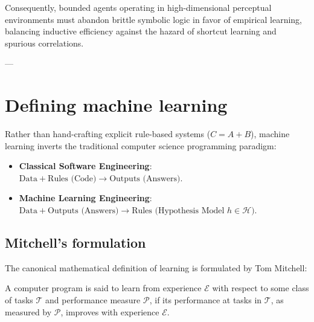 Consequently, bounded agents operating in high-dimensional perceptual environments must abandon brittle symbolic logic in favor of empirical learning, balancing inductive efficiency against the hazard of shortcut learning and spurious correlations.

---

\section{Defining machine learning}
\label{sec:definition_of_machine_learning}

Rather than hand-crafting explicit rule-based systems ($C = A + B$), machine learning inverts the traditional computer science programming paradigm:
\begin{itemize}
  \item \textbf{Classical Software Engineering}: $\text{Data} + \text{Rules (Code)} \longrightarrow \text{Outputs (Answers)}$.
  \item \textbf{Machine Learning Engineering}: $\text{Data} + \text{Outputs (Answers)} \longrightarrow \text{Rules (Hypothesis Model } h \in \mathcal{H}\text{)}$.
\end{itemize}

\subsection{Mitchell's formulation}
\label{sec:mitchell_formulation}

The canonical mathematical definition of learning is formulated by Tom Mitchell:
\begin{definition}
A computer program is said to learn from experience $\mathcal{E}$ with respect to some class of tasks $\mathcal{T}$ and performance measure $\mathcal{P}$, if its performance at tasks in $\mathcal{T}$, as measured by $\mathcal{P}$, improves with experience $\mathcal{E}$.
\end{definition}

